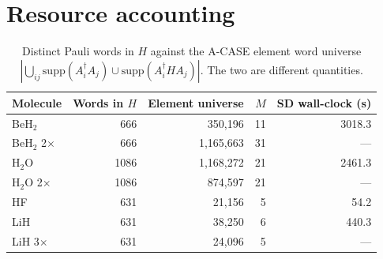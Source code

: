 \documentclass[11pt]{article}
\begin{document}
\section{Resource accounting}

\begin{table}[h]
\centering
\caption{Distinct Pauli words in $H$ against the A-CASE element word universe $|\bigcup_{ij}\mathrm{supp}(A_i^\dagger A_j) \cup \mathrm{supp}(A_i^\dagger H A_j)|$. The two are different quantities.}
\begin{tabular}{lrrrr}
\toprule
Molecule & Words in $H$ & Element universe & $M$ & SD wall-clock (s) \\
\midrule
BeH$_2$ & 666 & 350,196 & 11 & 3018.3 \\
BeH$_2$ 2$\times$ & 666 & 1,165,663 & 31 & --- \\
H$_2$O & 1086 & 1,168,272 & 21 & 2461.3 \\
H$_2$O 2$\times$ & 1086 & 874,597 & 21 & --- \\
HF & 631 & 21,156 & 5 & 54.2 \\
LiH & 631 & 38,250 & 6 & 440.3 \\
LiH 3$\times$ & 631 & 24,096 & 5 & --- \\
\bottomrule
\end{tabular}
\end{table}
\end{document}
